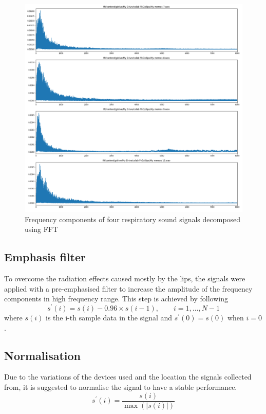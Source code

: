 \begin{figure}[h]
    \centerline{\includegraphics[scale=0.33]{figures/fft.png}}
    \caption{Frequency components of four respiratory sound signals decomposed using FFT}
    \label{fig:fft}
\end{figure}

\subsection{Emphasis filter}
To overcome the radiation effects caused mostly by the lips, the signals were applied with a pre-emphasised filter to increase the amplitude of the frequency components in high frequency range. This step is achieved by following 
\begin{equation}
s^\prime (i)=s(i) - 0.96 \times s(i-1), \qquad i=1, \ldots, N-1
\end{equation}
where $s(i)$ is the i-th sample data in the signal and $s^\prime(0) = s(0)$ when $i=0$.

\subsection{Normalisation}
Due to the variations of the devices used and the location the signals collected from, it is suggested to normalise the signal to have a stable performance.
\begin{equation}
s^\prime (i)=\frac{s(i)}{\max(|s(i)|)}
\end{equation}

